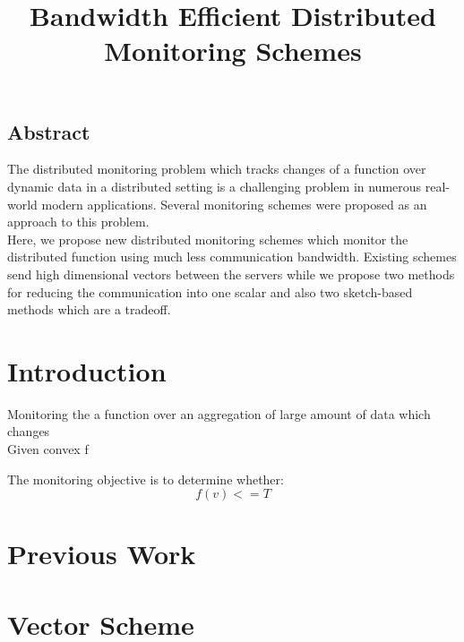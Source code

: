 \documentclass[10pt,a4paper]{article}
\begin{document}
\onehalfspacing
\sloppy
\setlength{\parindent}{0pt}


\title{Bandwidth Efficient Distributed Monitoring Schemes}
\date{}
\maketitle


\begin{multicols*}{2}
\begin{center}
\section*{Abstract}
\end{center}
The distributed monitoring problem which tracks changes of a function over dynamic data in a distributed setting is a challenging problem in numerous real-world modern applications. Several monitoring schemes were proposed as an approach to this problem. \\
Here, we propose new distributed monitoring schemes which monitor the distributed function using much less communication bandwidth. Existing schemes send high dimensional vectors between the servers while we propose two methods for reducing the communication into one scalar and also two sketch-based methods which are a tradeoff.

\section{Introduction}
Monitoring the a function over an aggregation of large amount of data which changes \\

Given convex f \label{fConvexity}

The monitoring objective is to determine whether:
\begin{equation}
\label{monitoringConstraint}
f(v) <= T
\end{equation}


\section{Previous Work}

\section{Vector Scheme}


\end{multicols*}
\end{document}
